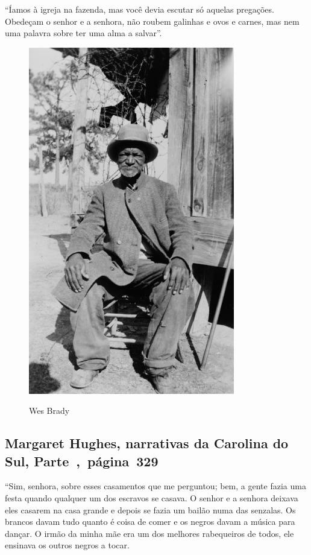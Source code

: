 ``Íamos à igreja na fazenda, mas você devia escutar só aquelas
pregações. Obedeçam o senhor e a senhora, não roubem galinhas e ovos e
carnes, mas nem uma palavra sobre ter uma alma a salvar''.

\begin{figure}[]
\centering
 \includegraphics[width=90mm]{./imgs/wesbrady_recorte.jpg} \label{img15}
\caption{Wes Brady}
\end{figure}

\subsection{Margaret Hughes, narrativas da Carolina do Sul, Parte~,~página~329}
\label{ref154}

``Sim, senhora, sobre esses casamentos que me perguntou; bem, a gente
fazia uma festa quando qualquer um dos escravos se casava. O senhor e a
senhora deixava eles casarem na casa grande e depois se fazia um bailão
numa das senzalas. Os brancos davam tudo quanto é coisa de comer e os
negros davam a música para dançar. O irmão da minha mãe era um dos
melhores rabequeiros de todos, ele ensinava os outros negros a tocar.


